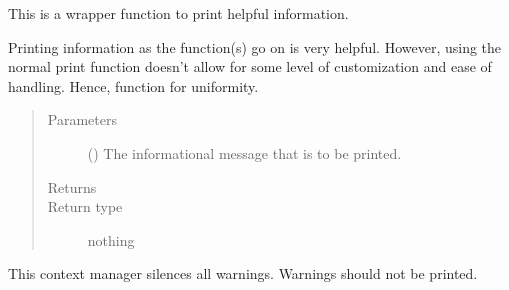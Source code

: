 \documentclass[letterpaper,10pt,english]{sphinxmanual}
\begin{document}

\begin{fulllineitems}
\label{\detokenize{python_docstrings/IfA_Smeargle.meta.errors:IfA_Smeargle.meta.errors.smeargle_info}}
This is a wrapper function to print helpful information.

Printing information as the function(s) go on is very helpful. However,
using the normal print function doesn’t allow for some level of
customization and ease of handling. Hence, function for uniformity.
\begin{quote}\begin{description}
\item[{Parameters}] \leavevmode
{} () \textendash{} The informational message that is to be printed.

\item[{Returns}] \leavevmode


\item[{Return type}] \leavevmode
nothing

\end{description}\end{quote}

\end{fulllineitems}


\begin{fulllineitems}
\label{\detokenize{python_docstrings/IfA_Smeargle.meta.errors:IfA_Smeargle.meta.errors.smeargle_silence_all_warnings}}
This context manager silences all warnings. Warnings should not be
printed.

\end{fulllineitems}

\end{document}
